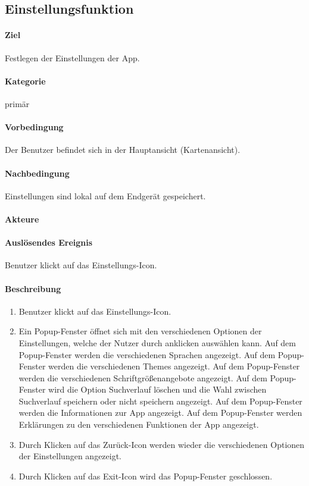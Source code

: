 \subsection{Einstellungsfunktion}
\label{Einstellungsfunktion}
\paragraph{Ziel}
Festlegen der Einstellungen der App.
\paragraph{Kategorie}
primär
\paragraph{Vorbedingung}
Der Benutzer befindet sich in der Hauptansicht (Kartenansicht).
\paragraph{Nachbedingung}
Einstellungen sind lokal auf dem Endgerät gespeichert.
\paragraph{Akteure}

\paragraph{Auslösendes Ereignis}
Benutzer klickt auf das Einstellungs-Icon.
\paragraph{Beschreibung}
\begin{enumerate}
    \item Benutzer klickt auf das Einstellungs-Icon.
    \item Ein Popup-Fenster öffnet sich mit den verschiedenen Optionen der Einstellungen, welche der Nutzer durch anklicken auswählen kann.
     Auf dem Popup-Fenster werden die verschiedenen Sprachen angezeigt.
     Auf dem Popup-Fenster werden die verschiedenen Themes angezeigt.
     Auf dem Popup-Fenster werden die verschiedenen Schriftgrößenangebote angezeigt.
     Auf dem Popup-Fenster wird die Option Suchverlauf löschen und die Wahl zwischen Suchverlauf speichern oder nicht speichern angezeigt.
     Auf dem Popup-Fenster werden die Informationen zur App angezeigt.
     Auf dem Popup-Fenster werden Erklärungen zu den verschiedenen Funktionen der App angezeigt.
    \item Durch Klicken auf das Zurück-Icon werden wieder die verschiedenen Optionen der Einstellungen angezeigt.
    \item Durch Klicken auf das Exit-Icon wird das Popup-Fenster geschlossen.
\end{enumerate}
